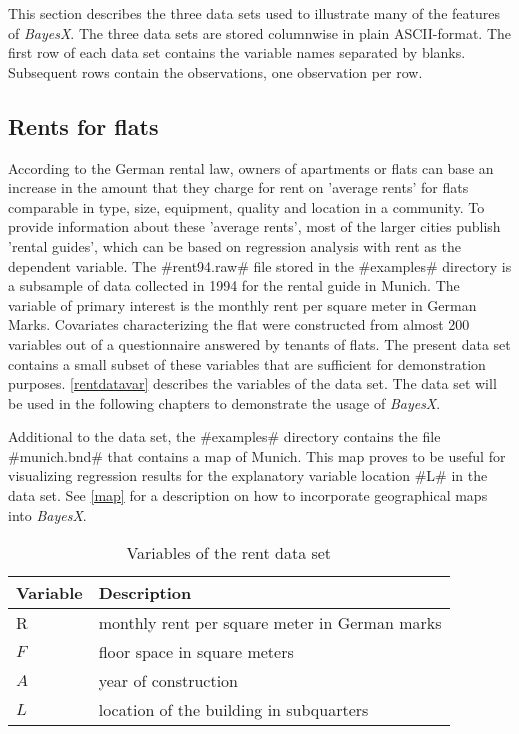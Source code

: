 This section describes the three data sets used to illustrate many
of the features of {\em BayesX}. The three data sets are stored
columnwise in plain ASCII-format. The first row of each data set
contains the variable names separated by blanks. Subsequent rows
contain the observations, one observation per row.

\subsection{Rents for flats}
\label{rentdata}  

According to the German rental law, owners of apartments or flats
can base an increase in the amount that they charge for rent on
'average rents' for flats comparable in type, size, equipment,
quality and location in a community. To provide information about
these 'average rents', most of the larger cities publish 'rental
guides', which can be based on regression analysis with rent as
the dependent variable. The #rent94.raw# file stored in the
#examples# directory is a subsample of data collected in 1994 for
the rental guide in Munich. The variable of primary interest is
the monthly rent per square meter in German Marks. Covariates
characterizing the flat were constructed from almost 200 variables
out of a questionnaire answered by tenants of flats. The present
data set contains a small subset of these variables that are
sufficient for demonstration purposes. \autoref{rentdatavar} describes the
variables of the data set. The data set will be used in the
following chapters to demonstrate the usage of {\em BayesX}.

Additional to the data set, the #examples# directory contains
the file #munich.bnd# that contains a map of Munich. This map
proves to be useful for visualizing regression results for the
explanatory variable location #L# in the data set. See
\autoref{map} for a description on how to incorporate geographical
maps into {\em BayesX}.

\begin{table}

\centering
\begin{tabular}{|l|l|}
\hline
{\bf Variable} & {\bf Description} \\
\hline
R & monthly rent per square meter in German marks \\
$F$ & floor space in square meters \\
$A$ & year of construction \\
$L$ & location of the building in subquarters \\
 \hline
\end{tabular}
{\em \caption{\label{rentdatavar}Variables of the rent data set}}
\end{table}



